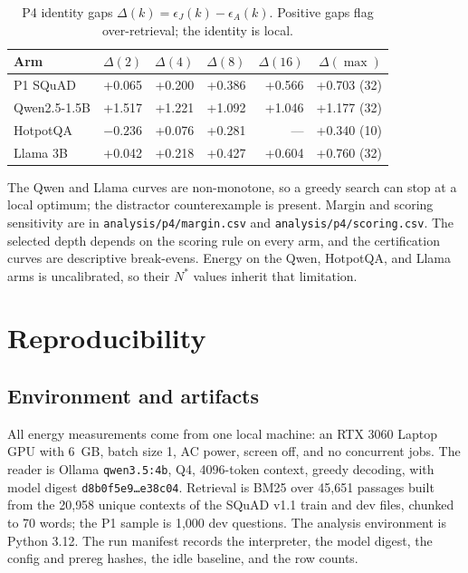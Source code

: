 \documentclass[a4paper,fleqn]{cas-sc}
\begin{document}
\begin{table}[pos=htbp]
  \centering
  \caption{P4 identity gaps $\Delta(k)=\epsilon_J(k)-\epsilon_A(k)$. Positive
  gaps flag over-retrieval; the identity is local.}
  \label{tab:s10identity}
  \footnotesize
  \begin{tabular}{@{}lrrrrr@{}}
    \toprule
    \textbf{Arm} & $\Delta(2)$ & $\Delta(4)$ & $\Delta(8)$ & $\Delta(16)$ & $\Delta(\max)$ \\
    \midrule
    P1 SQuAD & +0.065 & +0.200 & +0.386 & +0.566 & +0.703 (32) \\
    Qwen2.5-1.5B & +1.517 & +1.221 & +1.092 & +1.046 & +1.177 (32) \\
    HotpotQA & $-0.236$ & +0.076 & +0.281 & --- & +0.340 (10) \\
    Llama 3B & +0.042 & +0.218 & +0.427 & +0.604 & +0.760 (32) \\
    \bottomrule
  \end{tabular}
\end{table}

The Qwen and Llama curves are non-monotone, so a greedy search can stop at a
local optimum; the distractor counterexample is present. Margin and scoring
sensitivity are in \texttt{analysis/p4/margin.csv} and
\texttt{analysis/p4/scoring.csv}. The selected depth depends on the scoring
rule on every arm, and the certification curves are descriptive break-evens.
Energy on the Qwen, HotpotQA, and Llama arms is uncalibrated, so their $N^*$
values inherit that limitation.

\section{Reproducibility}\label{sec:s7}

\subsection{Environment and artifacts}

All energy measurements come from one local machine: an RTX 3060 Laptop GPU with 6~GB, batch
size 1, AC power, screen off, and no concurrent jobs. The reader is Ollama
\texttt{qwen3.5:4b}, Q4, 4096-token context, greedy decoding, with model digest
\texttt{d8b0f5e9\ldots e38c04}. Retrieval is BM25 over 45{,}651 passages built from the 20{,}958
unique contexts of the SQuAD v1.1 train and dev files, chunked to 70 words; the P1 sample is
1{,}000 dev questions. The analysis
environment is Python 3.12. The run manifest records the interpreter, the model digest, the
config and prereg hashes, the idle baseline, and the row counts.
\end{document}

